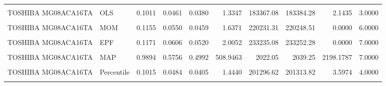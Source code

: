 \documentclass[
]{article}
\begin{document}
\begin{longtable}[t]{llrrrrrrrr}
\cellcolor{gray!10}{TOSHIBA MG07ACA14TA} & \cellcolor{gray!10}{Percentile} & \cellcolor{gray!10}{0.1069} & \cellcolor{gray!10}{0.0447} & \cellcolor{gray!10}{0.0363} & \cellcolor{gray!10}{2.1256} & \cellcolor{gray!10}{181286.55} & \cellcolor{gray!10}{181303.61} & \cellcolor{gray!10}{5.8995} & \cellcolor{gray!10}{3.0000}\\
TOSHIBA MG08ACA16TA & OLS & 0.1011 & 0.0461 & 0.0380 & 1.3347 & 183367.08 & 183384.28 & 2.1435 & 3.0000\\
\addlinespace
\cellcolor{gray!10}{TOSHIBA MG08ACA16TA} & \cellcolor{gray!10}{WLS} & \cellcolor{gray!10}{0.0944} & \cellcolor{gray!10}{0.0440} & \cellcolor{gray!10}{0.0360} & \cellcolor{gray!10}{1.2738} & \cellcolor{gray!10}{183248.73} & \cellcolor{gray!10}{183265.93} & \cellcolor{gray!10}{3.3479} & \cellcolor{gray!10}{2.0000}\\
TOSHIBA MG08ACA16TA & MOM & 0.1155 & 0.0550 & 0.0459 & 1.6371 & 220231.31 & 220248.51 & 0.0000 & 6.0000\\
\cellcolor{gray!10}{TOSHIBA MG08ACA16TA} & \cellcolor{gray!10}{L-Moments} & \cellcolor{gray!10}{0.1148} & \cellcolor{gray!10}{0.0525} & \cellcolor{gray!10}{0.0433} & \cellcolor{gray!10}{1.4942} & \cellcolor{gray!10}{213201.08} & \cellcolor{gray!10}{213218.28} & \cellcolor{gray!10}{0.0000} & \cellcolor{gray!10}{5.0000}\\
TOSHIBA MG08ACA16TA & EPF & 0.1171 & 0.0606 & 0.0520 & 2.0052 & 233235.08 & 233252.28 & 0.0000 & 7.0000\\
\cellcolor{gray!10}{TOSHIBA MG08ACA16TA} & \cellcolor{gray!10}{MLE} & \cellcolor{gray!10}{0.9897} & \cellcolor{gray!10}{0.5755} & \cellcolor{gray!10}{0.4990} & \cellcolor{gray!10}{483.6366} & \cellcolor{gray!10}{1984.96} & \cellcolor{gray!10}{2002.16} & \cellcolor{gray!10}{21779.7631} & \cellcolor{gray!10}{5.0000}\\
\addlinespace
TOSHIBA MG08ACA16TA & MAP & 0.9894 & 0.5756 & 0.4992 & 508.9463 & 2022.05 & 2039.25 & 2198.1787 & 7.0000\\
\cellcolor{gray!10}{TOSHIBA MG08ACA16TA} & \cellcolor{gray!10}{MCMC} & \cellcolor{gray!10}{0.9897} & \cellcolor{gray!10}{0.5755} & \cellcolor{gray!10}{0.4990} & \cellcolor{gray!10}{483.9352} & \cellcolor{gray!10}{1984.96} & \cellcolor{gray!10}{2002.16} & \cellcolor{gray!10}{22134.5002} & \cellcolor{gray!10}{6.0000}\\
TOSHIBA MG08ACA16TA & Percentile & 0.1015 & 0.0484 & 0.0405 & 1.4440 & 201296.62 & 201313.82 & 3.5974 & 4.0000\\
\cellcolor{gray!10}{WDC WUH722222ALE6L4} & \cellcolor{gray!10}{OLS} & \cellcolor{gray!10}{0.0812} & \cellcolor{gray!10}{0.0339} & \cellcolor{gray!10}{0.0260} & \cellcolor{gray!10}{0.5157} & \cellcolor{gray!10}{195793.10} & \cellcolor{gray!10}{195810.31} & \cellcolor{gray!10}{2.9896} & \cellcolor{gray!10}{3.0000}\\

\end{longtable}
\end{document}
